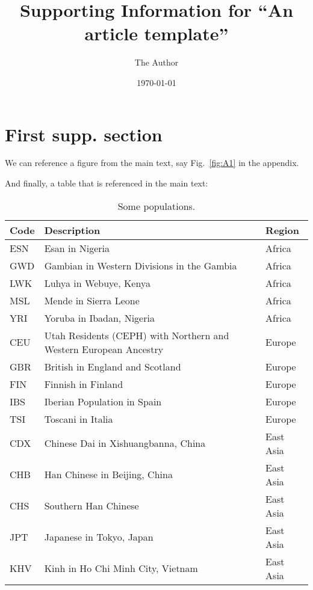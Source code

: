 \documentclass[]{article}
\begin{document}
\title{Supporting Information for ``An article template''}
\author[1,*]{The Author}
\date{\today}
\maketitle

\renewcommand{\thefigure}{S\arabic{figure}}
\renewcommand{\thetable}{S\arabic{table}}
\renewcommand{\theequation}{S\arabic{equation}}
\setcounter{figure}{0}
\setcounter{table}{0}
\setcounter{equation}{0}

\section{First supp. section}

\lipsum[1-2]

We can reference a figure from the main text, say Fig.~\ref{fig:A1} in the
appendix.

And finally, a table that is referenced in the main text:

\begin{table}[h]
\caption{\label{tab:1kgpops}Some \citet{10002015global} populations.}
\centering
\begin{tabular}[t]{lll}
\toprule
Code & Description & Region\\
\midrule
ESN & Esan in Nigeria & Africa\\
GWD & Gambian in Western Divisions in the Gambia & Africa\\
LWK & Luhya in Webuye, Kenya & Africa\\
MSL & Mende in Sierra Leone & Africa\\
YRI & Yoruba in Ibadan, Nigeria & Africa\\
\addlinespace
CEU & Utah Residents (CEPH) with Northern and Western European Ancestry & Europe\\
GBR & British in England and Scotland & Europe\\
FIN & Finnish in Finland & Europe\\
IBS & Iberian Population in Spain & Europe\\
TSI & Toscani in Italia & Europe\\
\addlinespace
CDX & Chinese Dai in Xishuangbanna, China & East Asia\\
CHB & Han Chinese in Beijing, China & East Asia\\
CHS & Southern Han Chinese & East Asia\\
JPT & Japanese in Tokyo, Japan & East Asia\\
KHV & Kinh in Ho Chi Minh City, Vietnam & East Asia\\
\bottomrule
\end{tabular}
\end{table}

\break



\end{document}
